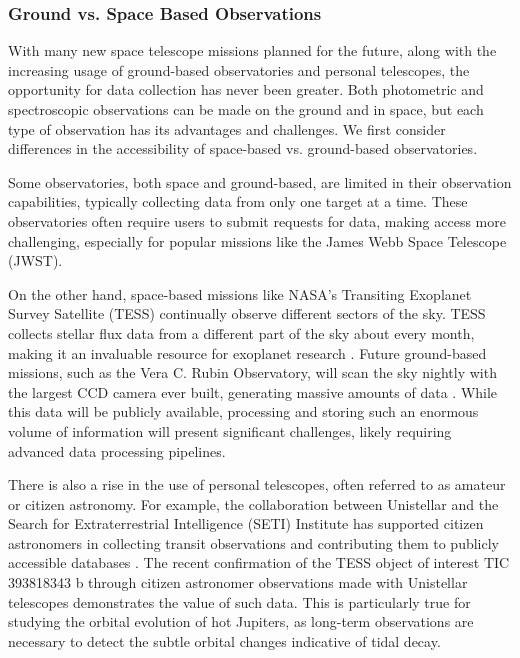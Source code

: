 \documentclass[oneside,12pt]{amsart}
\numberwithin{page}{section}
\begin{document}
\subsubsection{Ground vs. Space Based Observations}

With many new space telescope missions planned for the future, along with the increasing usage of ground-based observatories and personal telescopes, the opportunity for data collection has never been greater. Both photometric and spectroscopic observations can be made on the ground and in space, but each type of observation has its advantages and challenges. We first consider differences in the accessibility of space-based vs. ground-based observatories.

Some observatories, both space and ground-based, are limited in their observation capabilities, typically collecting data from only one target at a time. These observatories often require users to submit requests for data, making access more challenging, especially for popular missions like the James Webb Space Telescope (JWST).

On the other hand, space-based missions like NASA's Transiting Exoplanet Survey Satellite (TESS) continually observe different sectors of the sky. TESS collects stellar flux data from a different part of the sky about every month, making it an invaluable resource for exoplanet research \citep{guerrero2021tess}. Future ground-based missions, such as the Vera C. Rubin Observatory, will scan the sky nightly with the largest CCD camera ever built, generating massive amounts of data \citep{daukantas2024vera}. While this data will be publicly available, processing and storing such an enormous volume of information will present significant challenges, likely requiring advanced data processing pipelines.

There is also a rise in the use of personal telescopes, often referred to as amateur or citizen astronomy. For example, the collaboration between Unistellar and the Search for Extraterrestrial Intelligence (SETI) Institute has supported citizen astronomers in collecting transit observations and contributing them to publicly accessible databases \citep{peluso2023unistellar}. The recent confirmation of the TESS object of interest TIC 393818343 b through citizen astronomer observations made with Unistellar telescopes \citep{sgro2024confirmation} demonstrates the value of such data. This is particularly true for studying the orbital evolution of hot Jupiters, as long-term observations are necessary to detect the subtle orbital changes indicative of tidal decay.
\end{document}
